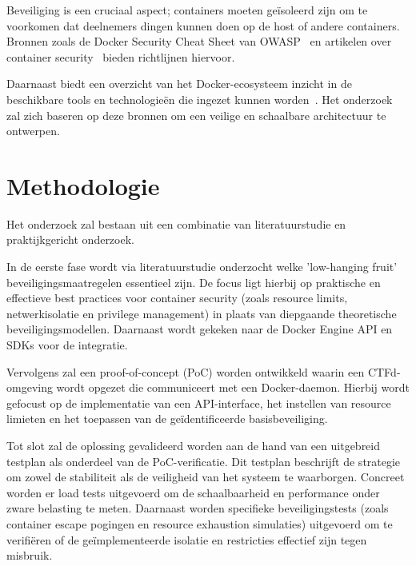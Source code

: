 Beveiliging is een cruciaal aspect; containers moeten geïsoleerd zijn om te voorkomen dat deelnemers dingen kunnen doen op de host of andere containers. Bronnen zoals de Docker Security Cheat Sheet van OWASP~\autocite{OWASP2024} en artikelen over container security~\autocite{Aikido2025} bieden richtlijnen hiervoor.

Daarnaast biedt een overzicht van het Docker-ecosysteem inzicht in de beschikbare tools en technologieën die ingezet kunnen worden~\autocite{Arxiv2024}. Het onderzoek zal zich baseren op deze bronnen om een veilige en schaalbare architectuur te ontwerpen.

\section{Methodologie}%
\label{sec:methodologie}

Het onderzoek zal bestaan uit een combinatie van literatuurstudie en praktijkgericht onderzoek.

In de eerste fase wordt via literatuurstudie onderzocht welke 'low-hanging fruit' beveiligingsmaatregelen essentieel zijn. De focus ligt hierbij op praktische en effectieve best practices voor container security (zoals resource limits, netwerkisolatie en privilege management) in plaats van diepgaande theoretische beveiligingsmodellen. Daarnaast wordt gekeken naar de Docker Engine API en SDKs voor de integratie.

Vervolgens zal een proof-of-concept (PoC) worden ontwikkeld waarin een CTFd-omgeving wordt opgezet die communiceert met een Docker-daemon. Hierbij wordt gefocust op de implementatie van een API-interface, het instellen van resource limieten en het toepassen van de geïdentificeerde basisbeveiliging.

Tot slot zal de oplossing gevalideerd worden aan de hand van een uitgebreid testplan als onderdeel van de PoC-verificatie. Dit testplan beschrijft de strategie om zowel de stabiliteit als de veiligheid van het systeem te waarborgen. Concreet worden er load tests uitgevoerd om de schaalbaarheid en performance onder zware belasting te meten. Daarnaast worden specifieke beveiligingstests (zoals container escape pogingen en resource exhaustion simulaties) uitgevoerd om te verifiëren of de geïmplementeerde isolatie en restricties effectief zijn tegen misbruik.

